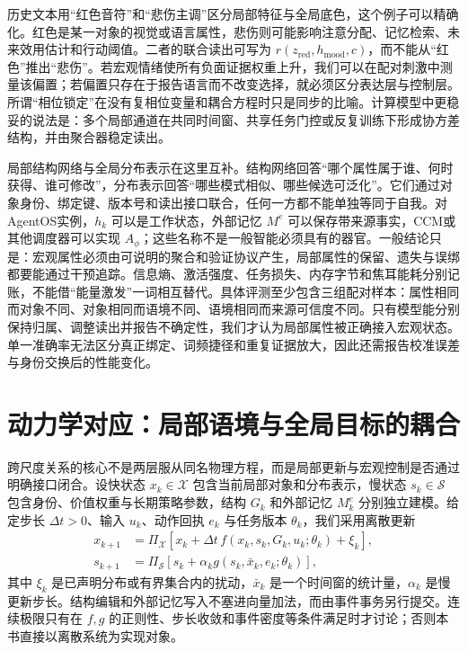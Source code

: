 历史文本用“红色音符”和“悲伤主调”区分局部特征与全局底色，这个例子可以精确化。红色是某一对象的视觉或语言属性，悲伤则可能影响注意分配、记忆检索、未来效用估计和行动阈值。二者的联合读出可写为 $r(z_{\mathrm{red}},h_{\mathrm{mood}},c)$，而不能从“红色”推出“悲伤”。若宏观情绪使所有负面证据权重上升，我们可以在配对刺激中测量该偏置；若偏置只存在于报告语言而不改变选择，就必须区分表达层与控制层。所谓“相位锁定”在没有复相位变量和耦合方程时只是同步的比喻。计算模型中更稳妥的说法是：多个局部通道在共同时间窗、共享任务门控或反复训练下形成协方差结构，并由聚合器稳定读出。

局部结构网络与全局分布表示在这里互补。结构网络回答“哪个属性属于谁、何时获得、谁可修改”，分布表示回答“哪些模式相似、哪些候选可泛化”。它们通过对象身份、绑定键、版本号和读出接口联合，任何一方都不能单独等同于自我。对AgentOS实例，$h_k$ 可以是工作状态，外部记忆 $M^e$ 可以保存带来源事实，CCM或其他调度器可以实现 $A_{\phi}$；这些名称不是一般智能必须具有的器官。一般结论只是：宏观属性必须由可说明的聚合和验证协议产生，局部属性的保留、遗失与误绑都要能通过干预追踪。信息熵、激活强度、任务损失、内存字节和焦耳能耗分别记账，不能借“能量激发”一词相互替代。具体评测至少包含三组配对样本：属性相同而对象不同、对象相同而语境不同、语境相同而来源可信度不同。只有模型能分别保持归属、调整读出并报告不确定性，我们才认为局部属性被正确接入宏观状态。单一准确率无法区分真正绑定、词频捷径和重复证据放大，因此还需报告校准误差与身份交换后的性能变化。

\section{动力学对应：局部语境与全局目标的耦合}
\label{sec:section_3335}
跨尺度关系的核心不是两层服从同名物理方程，而是局部更新与宏观控制是否通过明确接口闭合。设快状态 $x_k\in\mathcal{X}$ 包含当前局部对象和分布表示，慢状态 $s_k\in\mathcal{S}$ 包含身份、价值权重与长期策略参数，结构 $G_k$ 和外部记忆 $M^e_k$ 分别独立建模。给定步长 $\Delta t>0$、输入 $u_k$、动作回执 $e_k$ 与任务版本 $\theta_k$，我们采用离散更新
\[
\begin{aligned}
x_{k+1}&=\Pi_{\mathcal X}\!\left[x_k+\Delta t\,f(x_k,s_k,G_k,u_k;\theta_k)+\xi_k\right],\\
s_{k+1}&=\Pi_{\mathcal S}\!\left[s_k+\alpha_k g(s_k,\bar x_k,e_k;\theta_k)\right],
\end{aligned}
\]
其中 $\xi_k$ 是已声明分布或有界集合内的扰动，$\bar x_k$ 是一个时间窗的统计量，$\alpha_k$ 是慢更新步长。结构编辑和外部记忆写入不塞进向量加法，而由事件事务另行提交。连续极限只有在 $f,g$ 的正则性、步长收敛和事件密度等条件满足时才讨论；否则本书直接以离散系统为实现对象。

